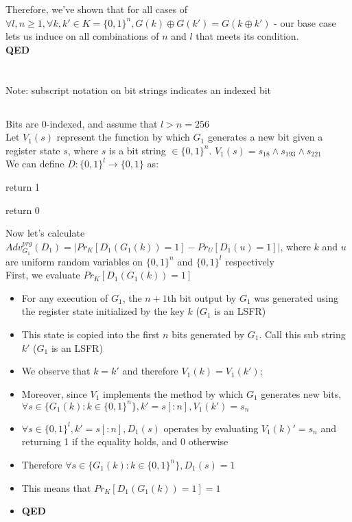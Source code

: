\documentclass[]{article}
\begin{document}
Therefore, we've shown that for all cases of $\forall l, n \geq 1, \forall k, k' \in K = \{0,1\}^n, G(k) \oplus G(k') = G(k \oplus k')$ - our base case lets us induce on all combinations of $n$ and $l$ that meets its condition.
\\
\textbf{QED}

\section{}
Note: subscript notation on bit strings indicates an indexed bit
\subsection{}
Bits are 0-indexed, and assume that $l > n = 256$
\\
Let $V_1(s)$ represent the function by which $G_1$ generates a new bit given a register state $s$, where $s$ is a bit string $\in \{0,1\}^n$. $V_1(s) = s_{18} \land s_{193} \land s_{221}$
\\
We can define $D:\{0,1\}^l \rightarrow \{0,1\}$ as:
\\
\begin{algorithm}[H]
	 {
		return 1
	}
	
	return 0
	\caption{$D_1(s)$}
\end{algorithm}

Now let's calculate $Adv^{prg}_{G_1}(D_1) = |Pr_K[D_1(G_1(k)) = 1] - Pr_U[D_1(u)=1]|$, where $k$ and $u$ are uniform random variables on $\{0,1\}^n$ and $\{0,1\}^l$ respectively
\\
First, we evaluate $Pr_K[D_1(G_1(k)) = 1]$
\begin{itemize}
	\item For any execution of $G_1$, the $n + 1$th bit output by $G_1$ was generated using the register state initialized by the key $k$ ($G_1$ is an LSFR)
	\item This state is copied into the first $n$ bits generated by $G_1$. Call this sub string $k'$ ($G_1$ is an LSFR)
	\item We observe that $k = k'$ and therefore $V_1(k) = V_1(k')$;
	\item Moreover, since $V_1$ implements the method by which $G_1$ generates new bits, $\forall s \in \{G_1(k): k \in \{0,1\}^n\}, k' = s[:n], V_1(k') = s_{n}$
	\item $\forall s \in \{0,1\}^l, k' = s[:n], D_1(s)$ operates by evaluating $V_1(k)' = s_{n}$ and returning  1 if the equality holds, and 0 otherwise
	\item Therefore $\forall s \in \{G_1(k): k \in \{0,1\}^n\}, D_1(s) = 1$
	\item This means that $Pr_K[D_1(G_1(k)) = 1] = 1$
	\item \textbf{QED}
\end{itemize}
\end{document}
